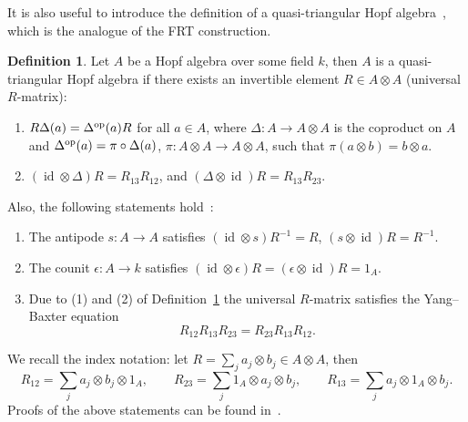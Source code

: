 \documentclass[10pt,a4paper]{amsart}
\numberwithin{equation}{section}
\theoremstyle{definition}
\newtheorem{defn}[thm]{Definition}
\newcommand{\id}{\operatorname{id}}
\def\mathcal#1{#1}%
\begin{document}
It is also useful to introduce the definition of a quasi-triangular Hopf algebra~\cite{Drinfeld, Drinfeld1, Drinfeld2}, which is the analogue of the FRT construction.
\begin{defn} \label{quasi}
Let $\mathcal{A}$ be a Hopf algebra over some field $k$, then $\mathcal{A}$ is a quasi-triangular Hopf algebra if there exists an invertible element ${\mathcal R} \in \mathcal{A}\otimes \mathcal{A}$ (universal ${\mathcal R}$-matrix):
\begin{enumerate}\itemsep=0pt
 \item ${\mathcal R} \Delta(a) =\Delta^{\rm op}(a) {\mathcal R}$ for all $a \in \mathcal{A}$,
 where $\Delta\colon \mathcal{A} \to \mathcal{A} \otimes \mathcal{A}$ is the coproduct on $\mathcal{A}$ and $\Delta^{\rm op}(a) = \pi \circ \Delta(a)$, $\pi\colon \mathcal{A} \otimes \mathcal{A} \to \mathcal{A} \otimes \mathcal{A}$, such that $\pi (a \otimes b) = b \otimes a$.
 \item $(\id \otimes \Delta){\mathcal R} = {\mathcal R}_{13} {\mathcal R}_{12}$, and $(\Delta \otimes \id){\mathcal R} = {\mathcal R}_{13} {\mathcal R}_{23}$.
\end{enumerate}
\end{defn}
Also, the following statements hold~\cite{Majid}:
\begin{enumerate}\itemsep=0pt
\item[{(a)}] The antipode
$s\colon \mathcal{A} \to \mathcal{A}$
satisfies $(\id \otimes s){\mathcal R}^{-1} = {\mathcal R}$,
$(s \otimes \id){\mathcal R} ={\mathcal R}^{-1}$.
\item[{(b)}] The counit $\epsilon\colon \mathcal{A} \to k$ satisfies $(\id \otimes \epsilon) {\mathcal R} = (\epsilon \otimes \id){\mathcal R} = 1_\mathcal{A}$.
\item[{(c)}] Due to (1) and (2) of Definition~\ref{quasi} the universal ${\mathcal R}$-matrix satisfies the Yang--Baxter equation
\begin{equation}
{\mathcal R}_{12} {\mathcal R}_{13} {\mathcal R}_{23} ={\mathcal R}_{23} {\mathcal R}_{13} {\mathcal R}_{12}. \label{UYBE}
\end{equation}
\end{enumerate}
We recall the index notation: let
${\mathcal R} = \sum_j a_j \otimes b_j \in \mathcal{A} \otimes \mathcal{A}$, then
\[
{\mathcal R}_{12} = \sum_j a_j \otimes b_j \otimes 1_\mathcal{A}, \qquad
{\mathcal R}_{23} = \sum_j 1_\mathcal{A} \otimes a_j \otimes b_j,\qquad
{\mathcal R}_{13} = \sum_j a_j \otimes 1_\mathcal{A} \otimes b_j.
\]
Proofs of the above statements can be found in~\cite{Chari, Majid}.
\end{document}
